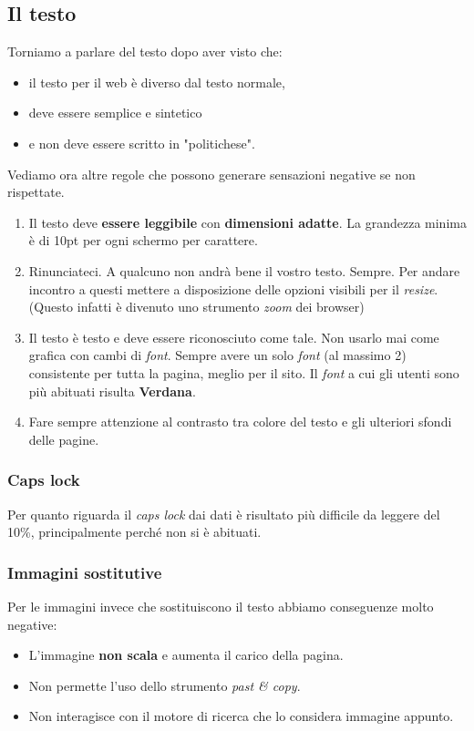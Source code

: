 		\subsection{Il testo}
			Torniamo a parlare del testo dopo aver visto che:
			\begin{itemize}
				\item il testo per il web è diverso dal testo normale,
				\item deve essere semplice e sintetico
				\item e non deve essere scritto in "politichese".
			\end{itemize}
			Vediamo ora altre regole che possono generare sensazioni negative se non rispettate.
			\begin{enumerate}
				\item Il testo deve \textbf{essere leggibile} con \textbf{dimensioni adatte}. La grandezza minima è di 10pt per ogni schermo per carattere.
				\item Rinunciateci. A qualcuno non andrà bene il vostro testo. Sempre. Per andare incontro a questi mettere a disposizione delle opzioni visibili per il \emph{resize}. (Questo infatti è divenuto uno strumento \emph{zoom} dei browser)
				\item Il testo è testo e deve essere riconosciuto come tale. Non usarlo mai come grafica con cambi di \emph{font}. Sempre avere un solo \emph{font} (al massimo 2) consistente per tutta la pagina, meglio per il sito. Il \emph{font} a cui gli utenti sono più abituati risulta \textbf{Verdana}.
				\item Fare sempre attenzione al contrasto tra colore del testo e gli ulteriori sfondi delle pagine.
			\end{enumerate}
			
			\subsubsection{Caps lock}
				Per quanto riguarda il \emph{caps lock} dai dati è risultato più difficile da leggere del 10\%, principalmente perché non si è abituati.
			\subsubsection{Immagini sostitutive}
				Per le immagini invece che sostituiscono il testo abbiamo conseguenze molto negative:
				\begin{itemize}
					\item L'immagine \textbf{non scala} e aumenta il carico della pagina.
					\item Non permette l'uso dello strumento \emph{past \& copy}.
					\item Non interagisce con il motore di ricerca che lo considera immagine appunto. 
				\end{itemize}
				
